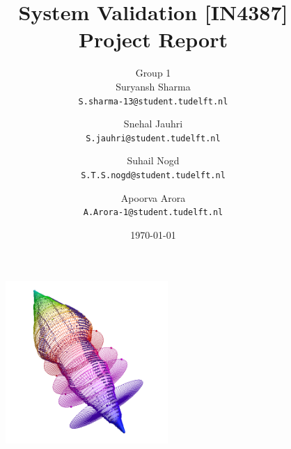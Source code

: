 \documentclass[a4paper,12pt]{article}
\begin{document}
	\begin{titlepage}
	\title{System Validation [IN4387] \\Project Report}
	\author{
	    Group 1
		\\Suryansh Sharma \\ 
		\texttt{S.sharma-13@student.tudelft.nl}
		\and 
		Snehal Jauhri \\
		\texttt{S.jauhri@student.tudelft.nl} 
		\and
		Suhail Nogd \\
		\texttt{S.T.S.nogd@student.tudelft.nl} 	
		\and 
		Apoorva Arora\\
		\texttt{A.Arora-1@student.tudelft.nl} 
	}
	\date {\today}
	\clearpage
	\maketitle
    \begin{figure}[ht]
		\centerline{
			\includegraphics[width=0.55\textwidth, ]{cover.png}}
	\end{figure}
	
    \thispagestyle{empty}
	\end{titlepage}
	\newpage
	
	\tableofcontents
	
	\newpage
\end{document}
